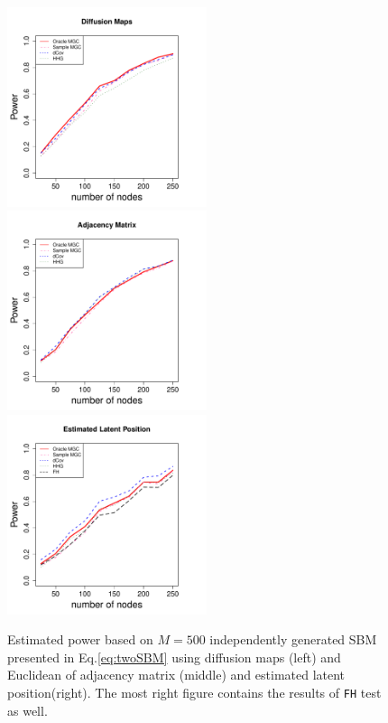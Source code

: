 \documentclass[12pt]{article}
\theoremstyle{definition}
\begin{document}
\begin{figure}[H]
	\centering
	\label{fig:twoSBM}
	\includegraphics[width=2.3in]{../Figure/twoSBM.pdf}
	\includegraphics[width=2.3in]{../Figure/EtwoSBM.pdf}
	\includegraphics[width =2.3in]{../Figure/ftwoSBM.pdf}
	\caption{Estimated power based on $M = 500$ independently generated SBM presented in Eq.\ref{eq:twoSBM} using diffusion maps (left) and Euclidean of adjacency matrix (middle)  and estimated latent position(right). The most right figure contains the results of \texttt{FH} test as well.}
\end{figure}
\end{document}
